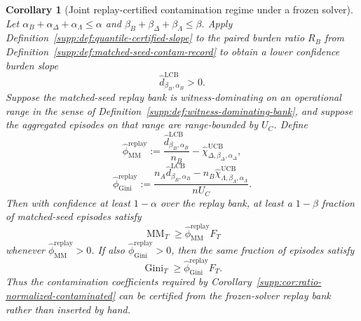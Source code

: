 \documentclass[11pt]{article}
\newcommand{\1}{\mathbf{1}}
\newcommand{\Gini}{\operatorname{Gini}}
\newcommand{\MM}{\operatorname{MM}}
\theoremstyle{definition}
\theoremstyle{plain}
\newtheorem{corollary}[definition]{Corollary}
\theoremstyle{remark}
\begin{document}
\begin{corollary}[Joint replay-certified contamination regime under a frozen solver]
\label{supp:cor:joint-replay-certified-contam}
Let $\alpha_B+\alpha_\Delta+\alpha_\Lambda \le \alpha$ and $\beta_B+\beta_\Delta+\beta_\Lambda \le \beta$. Apply Definition~\ref{supp:def:quantile-certified-slope} to the paired burden ratio $R_B$ from Definition~\ref{supp:def:matched-seed-contam-record} to obtain a lower confidence burden slope
\[
\widehat d^{\mathrm{LCB}}_{\beta_B,\alpha_B} > 0.
\]
Suppose the matched-seed replay bank is witness-dominating on an operational range in the sense of Definition~\ref{supp:def:witness-dominating-bank}, and suppose the aggregated episodes on that range are range-bounded by $U_C$. Define
\[
\widehat\phi_{\MM}^{\mathrm{replay}}
:=
\frac{\widehat d^{\mathrm{LCB}}_{\beta_B,\alpha_B}}{n_B}
-
\widehat\chi_{\Delta,\beta_\Delta,\alpha_\Delta}^{\mathrm{UCB}},
\]
\[
\widehat\phi_{\Gini}^{\mathrm{replay}}
:=
\frac{n_A\widehat d^{\mathrm{LCB}}_{\beta_B,\alpha_B} - n_B\widehat\chi_{\Lambda,\beta_\Lambda,\alpha_\Lambda}^{\mathrm{UCB}}}{nU_C}.
\]
Then with confidence at least $1-\alpha$ over the replay bank, at least a $1-\beta$ fraction of matched-seed episodes satisfy
\[
\MM_T \ge \widehat\phi_{\MM}^{\mathrm{replay}} F_T
\]
whenever $\widehat\phi_{\MM}^{\mathrm{replay}}>0$. If also $\widehat\phi_{\Gini}^{\mathrm{replay}}>0$, then the same fraction of episodes satisfy
\[
\Gini_T \ge \widehat\phi_{\Gini}^{\mathrm{replay}} F_T.
\]
Thus the contamination coefficients required by Corollary~\ref{supp:cor:ratio-normalized-contaminated} can be certified from the frozen-solver replay bank rather than inserted by hand.
\end{corollary}
\end{document}
